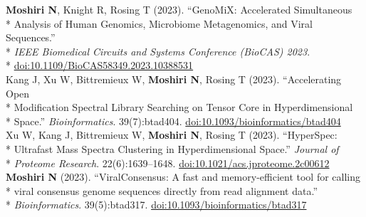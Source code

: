 \documentclass[margin,line]{res}
\begin{document}
\begin{resume}
\hspace*{9.5mm} \textbf{Moshiri N}, Knight R, Rosing T (2023). ``GenoMiX: Accelerated Simultaneous\\*
\hspace*{9.5mm} Analysis of Human Genomics, Microbiome Metagenomics, and Viral Sequences.''\\*
\hspace*{9.5mm} \textit{IEEE Biomedical Circuits and Systems Conference (BioCAS) 2023}.\\*\vspace{2mm}
\hspace*{8mm} \href{https://doi.org/10.1109/BioCAS58349.2023.10388531}{doi:10.1109/BioCAS58349.2023.10388531}\\
\hspace*{4mm} Kang J, Xu W, Bittremieux W, \textbf{Moshiri N}, Rosing T (2023). ``Accelerating Open\\*
\hspace*{9.5mm} Modification Spectral Library Searching on Tensor Core in Hyperdimensional\\*\vspace{2mm}
\hspace*{8.5mm} Space.'' \textit{Bioinformatics}. 39(7):btad404. \href{https://doi.org/10.1093/bioinformatics/btad404}{doi:10.1093/bioinformatics/btad404}\\
\hspace*{4mm} Xu W, Kang J, Bittremieux W, \textbf{Moshiri N}, Rosing T (2023). ``HyperSpec:\\*
\hspace*{9.5mm} Ultrafast Mass Spectra Clustering in Hyperdimensional Space.'' \textit{Journal of}\\*\vspace{2mm}
\hspace*{8mm} \textit{Proteome Research}. 22(6):1639--1648. \href{https://doi.org/10.1021/acs.jproteome.2c00612}{doi:10.1021/acs.jproteome.2c00612}\\
\hspace*{4mm} \textbf{Moshiri N} (2023). ``ViralConsensus: A fast and memory-efficient tool for calling\\*
\hspace*{9.5mm} viral consensus genome sequences directly from read alignment data.''\\*\vspace{2mm}
\hspace*{8mm} \textit{Bioinformatics}. 39(5):btad317. \href{https://doi.org/10.1093/bioinformatics/btad317}{doi:10.1093/bioinformatics/btad317}\\

\end{resume}
\end{document}
